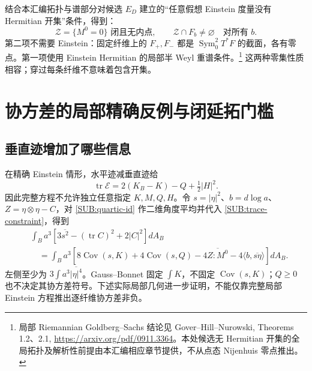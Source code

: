 \documentclass[UTF8,fontset=fandol,zihao=-4,oneside,openany]{ctexbook}
\theoremstyle{cjkplain}
\numberwithin{equation}{chapter}
\begin{document}
结合本汇编拓扑与谱部分对候选 $E_D$ 建立的“任意假想 Einstein 度量没有 Hermitian 开集”条件，得到：
\begin{equation}\label{SUB:gram-zero-set}
\mathcal Z=\{M^0=0\}\text{ 闭且无内点},\qquad
\mathcal Z\cap F_b\ne\varnothing\quad\text{对所有 }b.
\end{equation}
第二项不需要 Einstein：固定纤维上的 $F_+,F_-$ 都是
$\operatorname{Sym}_0^2T^*F$ 的截面，各有零点。第一项使用 Einstein Hermitian 的局部半 Weyl 重谱条件。\footnote{局部 Riemannian Goldberg--Sachs 结论见 Gover--Hill--Nurowski, Theorems 1.2、2.1, \url{https://arxiv.org/pdf/0911.3364}。本处候选无 Hermitian 开集的全局拓扑及解析性前提由本汇编相应章节提供，不从点态 Nijenhuis 零点推出。}
这两种零集性质相容；穿过每条纤维不意味着包含开集。

\section{协方差的局部精确反例与闭延拓门槛}

\subsection{垂直迹增加了哪些信息}

在精确 Einstein 情形，水平迹减垂直迹给
\begin{equation}\label{SUB:trace-constraint}
\operatorname{tr}\mathcal E=2(K_B-K)-Q+\tfrac12|H|^2.
\end{equation}
因此完整方程不允许独立任意指定 $K,M,Q,H$。令
$s=|\eta|^2$、$b=d\log a$、$Z=\eta\otimes\eta-C$，对 \eqref{SUB:quartic-id} 作二维角度平均并代入 \eqref{SUB:trace-constraint}，得到
\begin{equation}\label{SUB:quartic-trace}
\begin{aligned}
&\int_Ba^3[3\overline{s^2}-(\operatorname{tr}C)^2+2|C|^2]dA_B\\
&\quad=\int_Ba^3[8\operatorname{Cov}(s,K)+4\operatorname{Cov}(s,Q)
-4\overline{Z:M^0}-4\langle b,\overline{s\eta}\rangle]dA_B.
\end{aligned}
\end{equation}
左侧至少为 $3\int a^3\overline{|\eta|^4}$。Gauss--Bonnet 固定 $\int K$，不固定 $\operatorname{Cov}(s,K)$；$Q\ge0$ 也不决定其协方差符号。下述实际局部几何进一步证明，不能仅靠完整局部 Einstein 方程推出逐纤维协方差非负。
\end{document}
